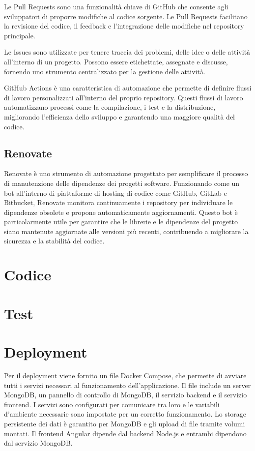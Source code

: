 \documentclass[12pt,a4paper,openright,twoside]{book}
\begin{document}
Le Pull Requests sono una funzionalità chiave di GitHub che consente agli sviluppatori di proporre modifiche al codice sorgente. Le Pull Requests facilitano la revisione del codice, il feedback e l'integrazione delle modifiche nel repository principale.

Le Issues sono utilizzate per tenere traccia dei problemi, delle idee o delle attività all'interno di un progetto. Possono essere etichettate, assegnate e discusse, fornendo uno strumento centralizzato per la gestione delle attività.

GitHub Actions è una caratteristica di automazione che permette di definire flussi di lavoro personalizzati all'interno del proprio repository. Questi flussi di lavoro automatizzano processi come la compilazione, i test e la distribuzione, migliorando l'efficienza dello sviluppo e garantendo una maggiore qualità del codice.

\section{Renovate}

Renovate è uno strumento di automazione progettato per semplificare il processo di manutenzione delle dipendenze dei progetti software. Funzionando come un bot all'interno di piattaforme di hosting di codice come GitHub, GitLab e Bitbucket, Renovate monitora continuamente i repository per individuare le dipendenze obsolete e propone automaticamente aggiornamenti. Questo bot è particolarmente utile per garantire che le librerie e le dipendenze del progetto siano mantenute aggiornate alle versioni più recenti, contribuendo a migliorare la sicurezza e la stabilità del codice.

\chapter{Codice}

\chapter{Test}

\chapter{Deployment}

Per il deployment viene fornito un file Docker Compose, che permette di avviare tutti i servizi necessari al funzionamento dell'applicazione. Il file include un server MongoDB, un pannello di controllo di MongoDB, il servizio backend e il servizio frontend. I servizi sono configurati per comunicare tra loro e le variabili d'ambiente necessarie sono impostate per un corretto funzionamento. Lo storage persistente dei dati è garantito per MongoDB e gli upload di file tramite volumi montati. Il frontend Angular dipende dal backend Node.js e entrambi dipendono dal servizio MongoDB.
\end{document}
